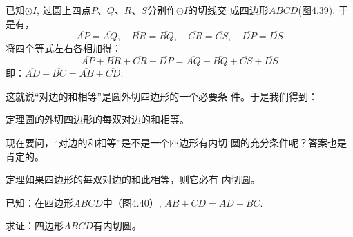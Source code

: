 已知$\odot I$, 过圆上四点$P$、$Q$、$R$、$S$分别作$\odot I$的切线交
成四边形$ABCD$(图4.39). 于是有，
\begin{equation*}
    \overline{AP}=\overline{AQ},\quad \overline{BR}=\overline{BQ},\quad \overline{CR}=\overline{CS},\quad 
\overline{DP}=\overline{DS}\tag{切线长定理}
\end{equation*}
将四个等式左右各相加得：
\[\overline{AP}+\overline{BR}+\overline{CR}+\overline{DP}=\overline{AQ}+\overline{BQ}+\overline{CS}+\overline{DS}\]
即：$\overline{AD}+\overline{BC}=\overline{AB}+\overline{CD}$.

这就说“对边的和相等”是圆外切四边形的一个必要条
件。于是我们得到：

\begin{blk}
    {定理}圆的外切四边形的每双对边的和相等。
\end{blk}

现在要问，“对边的和相等”是不是一个四边形有内切
圆的充分条件呢？答案也是肯定的。

\begin{blk}
    {定理}如果四边形的每双对边的和此相等，则它必有
内切圆。
\end{blk}

已知：在四边形$ABCD$中（图4.40）, $\overline{AB}+\overline{CD}=\overline{AD}+\overline{BC}$.

求证：四边形$ABCD$有内切圆。

\begin{figure}[htp]
    \centering
{}
    \caption{}
\end{figure}


